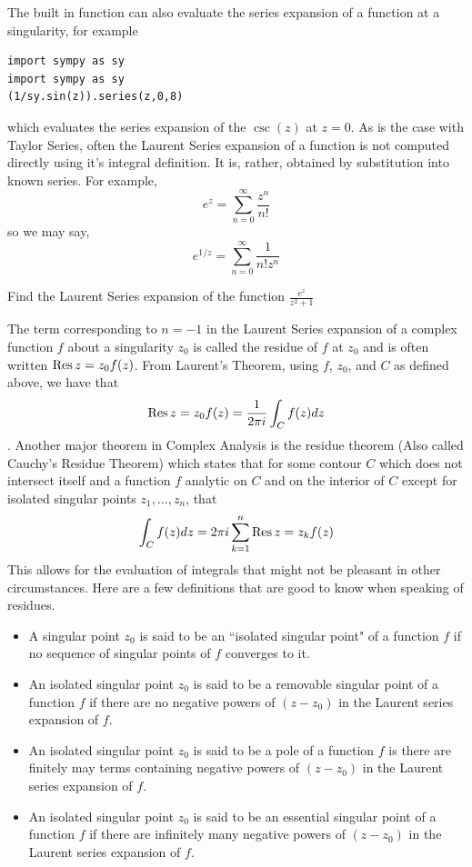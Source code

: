 The built in function  can also evaluate the series expansion of a function at a singularity, for example
\begin{lstlisting}
import sympy as sy
import sympy as sy
(1/sy.sin(z)).series(z,0,8)
\end{lstlisting}
which evaluates the series expansion of the $\csc(z)$ at $z=0$. 
As is the case with Taylor Series, often the Laurent Series expansion of a function is not computed directly using it's integral definition.
It is, rather, obtained by substitution into known series.
For example, 
$$e^z = \sum_{n=0}^{\infty} \frac{z^n}{n!}$$ so we may say,
$$e^{1/z} = \sum_{n=0}^{\infty} \frac{1}{n! z^n}$$

\begin{problem}
Find the Laurent Series expansion of the function $\frac{e^{z}}{z^2 +1}$
\end{problem}


The term corresponding to $n=-1$ in the Laurent Series expansion of a complex function $f$ about a singularity $z_0$ is called the residue of $f$ at $z_0$ and is often written $\operatorname{Res}{z=z_0} f(z)$.
From Laurent's Theorem, using $f$, $z_0$, and $C$ as defined above, we have that $$\operatorname{Res}{z=z_0} f(z) = \frac{1}{2 \pi i} \int_C f(z) dz$$.
Another major theorem in Complex Analysis is the residue theorem (Also called Cauchy's Residue Theorem) which states that for some contour $C$ which does not intersect itself and a function $f$ analytic on $C$ and on the interior of $C$ except for isolated singular points $z_1,...,z_n$, that 
$$\int_C f(z) dz = 2 \pi i \sum_{k=1}^{n} \operatorname{Res}{z=z_k} f(z)$$
This allows for the evaluation of integrals that might not be pleasant in other circumstances.
Here are a few definitions that are good to know when speaking of residues.
\begin{itemize}
\item A singular point $z_0$ is said to be an ``isolated singular point" of a function $f$ if no sequence of singular points of $f$ converges to it.
\item An isolated singular point $z_0$ is said to be a removable singular point of a function $f$ if there are no negative powers of $(z-z_0)$ in the Laurent series expansion of $f$.
\item An isolated singular point $z_0$ is said to be a pole of a function $f$ is there are finitely may terms containing negative powers of $(z-z_0)$ in the Laurent series expansion of $f$. 
\item An isolated singular point $z_0$ is said to be an essential singular point of a function $f$ if there are infinitely many negative powers of $(z-z_0)$ in the Laurent series expansion of $f$.
\end{itemize}

